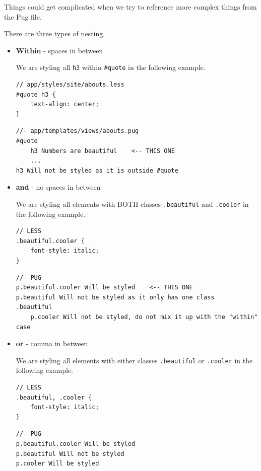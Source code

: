 Things could get complicated when we try to reference more complex things from the Pug file.

There are three types of nesting. 

\begin{itemize}
\item \textbf{Within} - spaces in between

We are styling all \texttt{h3} within \texttt{\#quote} in the following example.
    
\begin{lstlisting}[language=pug]
// app/styles/site/abouts.less
#quote h3 {
    text-align: center;
}
\end{lstlisting}
    
\begin{lstlisting}[language=pug]
//- app/templates/views/abouts.pug
#quote 
    h3 Numbers are beautiful    <-- THIS ONE
    ...
h3 Will not be styled as it is outside #quote
\end{lstlisting}
    
\item \textbf{and} - no spaces in between

We are styling all elements with BOTH classes \texttt{.beautiful} and \texttt{.cooler} in the following example.
    
\begin{lstlisting}[language=pug]
// LESS
.beautiful.cooler {
    font-style: italic;
}
\end{lstlisting}

\begin{lstlisting}[language=pug]
//- PUG
p.beautiful.cooler Will be styled    <-- THIS ONE
p.beautiful Will not be styled as it only has one class
.beautiful
    p.cooler Will not be styled, do not mix it up with the "within" case
\end{lstlisting}

\item \textbf{or} - comma in between

We are styling all elements with either classes \texttt{.beautiful} or \texttt{.cooler} in the following example.
    
\begin{lstlisting}[language=pug]
// LESS
.beautiful, .cooler {
    font-style: italic;
}
\end{lstlisting}

\begin{lstlisting}[language=pug]
//- PUG
p.beautiful.cooler Will be styled 
p.beautiful Will not be styled 
p.cooler Will be styled
\end{lstlisting}

\end{itemize}

